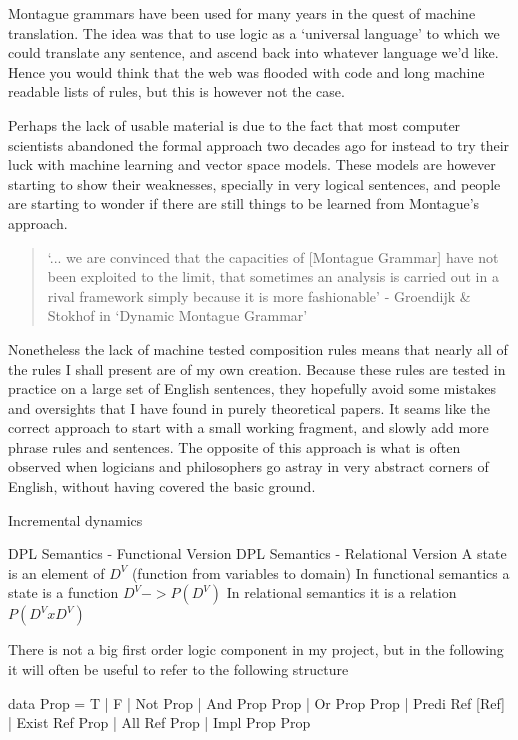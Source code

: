 \documentclass[12pt]{article}
\begin{document}
Montague grammars have been used for many years in the quest of machine translation. The idea was that to use logic as a `universal language' to which we could translate any sentence, and ascend back into whatever language we'd like. Hence you would think that the web was flooded with code and long machine readable lists of rules, but this is however not the case.

Perhaps the lack of usable material is due to the fact that most computer scientists abandoned the formal approach two decades ago for instead to try their luck with machine learning and vector space models. These models are however starting to show their weaknesses, specially in very logical sentences, and people are starting to wonder if there are still things to be learned from Montague's approach.
\begin{quotation}
`... we are convinced that the capacities of [Montague Grammar] have not been exploited to the limit, that sometimes an analysis is carried out in a rival framework simply because it is more fashionable' - Groendijk \& Stokhof in `Dynamic Montague Grammar'\cite{groenendijk1990dynamic}
\end{quotation}

Nonetheless the lack of machine tested composition rules means that nearly all of the rules I shall present are of my own creation. Because these rules are tested in practice on a large set of English sentences, they hopefully avoid some mistakes and oversights that I have found in purely theoretical papers. It seams like the correct approach to start with a small working fragment, and slowly add more phrase rules and sentences. The opposite of this approach is what is often observed when logicians and philosophers go astray in very abstract corners of English, without having covered the basic ground.




Incremental dynamics

DPL Semantics - Functional Version
DPL Semantics - Relational Version
A state is an element of $D^V$ (function from variables to domain)
In functional semantics a state is a function $D^V -> P(D^V)$
In relational semantics it is a relation $P(D^V x D^V)$

There is not a big first order logic component in my project, but in the following it will often be useful to refer to the following structure

\begin{haskell}
data Prop =
    T | F
  | Not   Prop
  | And   Prop Prop
  | Or    Prop Prop
  | Predi Ref [Ref]
  | Exist Ref Prop
  | All Ref Prop
  | Impl Prop Prop
\end{haskell}
\end{document}
